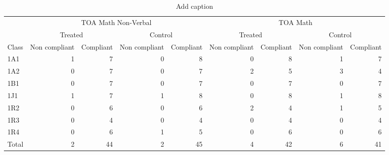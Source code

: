 \begin{table}[htbp]
  \centering
  \caption{Add caption}
    \begin{tabular}{l|rrrr|rrrr}
    \toprule
          & \multicolumn{4}{c|}{TOA Math Non-Verbal} & \multicolumn{4}{c}{TOA Math} \\
          & \multicolumn{2}{c}{Treated} & \multicolumn{2}{c|}{Control} & \multicolumn{2}{c}{Treated} & \multicolumn{2}{c}{Control} \\
    Class & \multicolumn{1}{l}{Non compliant} & Compliant & \multicolumn{1}{l}{Non compliant} & Compliant & \multicolumn{1}{l}{Non compliant} & Compliant & \multicolumn{1}{l}{Non compliant} & Compliant \\
    \midrule
    1A1   & 1     & 7     & 0     & 8     & 0     & 8     & 1     & 7 \\
    1A2   & 0     & 7     & 0     & 7     & 2     & 5     & 3     & 4 \\
    1B1   & 0     & 7     & 0     & 7     & 0     & 7     & 0     & 7 \\
    1J1   & 1     & 7     & 1     & 8     & 0     & 8     & 1     & 8 \\
    1R2   & 0     & 6     & 0     & 6     & 2     & 4     & 1     & 5 \\
    1R3   & 0     & 4     & 0     & 4     & 0     & 4     & 0     & 4 \\
    1R4   & 0     & 6     & 1     & 5     & 0     & 6     & 0     & 6 \\
    Total & 2     & 44    & 2     & 45    & 4     & 42    & 6     & 41 \\
    \bottomrule
    \end{tabular}%
  \label{tab:addlabel}%
\end{table}%
